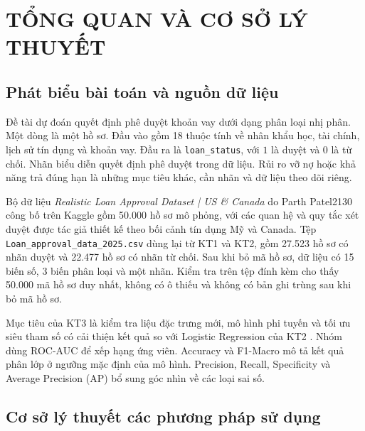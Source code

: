 \documentclass[12pt,a4paper,oneside]{report}
\begin{document}
\clearpage
{}
\pagestyle{fancy}

\chapter{TỔNG QUAN VÀ CƠ SỞ LÝ THUYẾT}

\section{Phát biểu bài toán và nguồn dữ liệu}

Đề tài dự đoán quyết định phê duyệt khoản vay dưới dạng phân loại nhị phân. Một dòng là một hồ sơ. Đầu vào gồm 18 thuộc tính về nhân khẩu học, tài chính, lịch sử tín dụng và khoản vay. Đầu ra là \texttt{loan\_status}, với $1$ là duyệt và $0$ là từ chối. Nhãn biểu diễn quyết định phê duyệt trong dữ liệu. Rủi ro vỡ nợ hoặc khả năng trả đúng hạn là những mục tiêu khác, cần nhãn và dữ liệu theo dõi riêng.

Bộ dữ liệu \textit{Realistic Loan Approval Dataset | US \& Canada} do Parth Patel2130 công bố trên Kaggle \cite{kaggle} gồm 50.000 hồ sơ mô phỏng, với các quan hệ và quy tắc xét duyệt được tác giả thiết kế theo bối cảnh tín dụng Mỹ và Canada. Tệp \texttt{Loan\_approval\_data\_2025.csv} dùng lại từ KT1 và KT2, gồm 27.523 hồ sơ có nhãn duyệt và 22.477 hồ sơ có nhãn từ chối. Sau khi bỏ mã hồ sơ, dữ liệu có 15 biến số, 3 biến phân loại và một nhãn. Kiểm tra trên tệp đính kèm cho thấy 50.000 mã hồ sơ duy nhất, không có ô thiếu và không có bản ghi trùng sau khi bỏ mã hồ sơ.

Mục tiêu của KT3 là kiểm tra liệu đặc trưng mới, mô hình phi tuyến và tối ưu siêu tham số có cải thiện kết quả so với Logistic Regression của KT2 \cite{kt2}. Nhóm dùng ROC-AUC để xếp hạng ứng viên. Accuracy và F1-Macro mô tả kết quả phân lớp ở ngưỡng mặc định của mô hình. Precision, Recall, Specificity và Average Precision (AP) bổ sung góc nhìn về các loại sai số.

\section{Cơ sở lý thuyết các phương pháp sử dụng}
\end{document}
